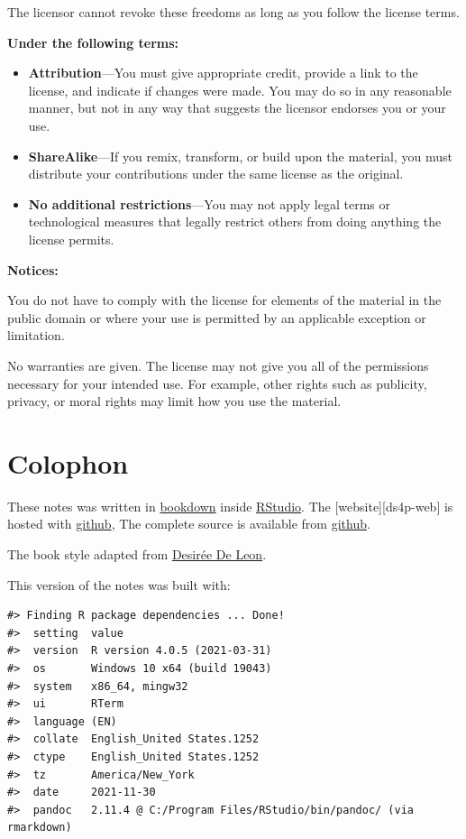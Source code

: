 \documentclass[
]{book}
\begin{document}
The licensor cannot revoke these freedoms as long as you follow the
license terms.

\textbf{Under the following terms:}

\begin{itemize}
\item
  \textbf{Attribution}---You must give appropriate credit, provide a link
  to the license, and indicate if changes were made. You may do so in
  any reasonable manner, but not in any way that suggests the licensor
  endorses you or your use.
\item
  \textbf{ShareAlike}---If you remix, transform, or build upon the material, you must distribute your contributions under the same license as the original.
\item
  \textbf{No additional restrictions}---You may not apply legal terms or
  technological measures that legally restrict others from doing
  anything the license permits.
\end{itemize}

\textbf{Notices:}

You do not have to comply with the license for elements of the
material in the public domain or where your use is permitted by an
applicable exception or limitation.

No warranties are given. The license may not give you all of the
permissions necessary for your intended use. For example, other rights
such as publicity, privacy, or moral rights may limit how you use the
material.

\hypertarget{colophon}{%
\chapter*{Colophon}\label{colophon}}

These notes was written in \href{http://bookdown.org/}{bookdown} inside \href{http://www.rstudio.com/ide/}{RStudio}. The {[}website{]}{[}ds4p-web{]} is hosted with \href{https://www.github.com}{github}, The complete source is available from \href{https://github.com/smasongarrison/syllabi}{github}.

The book style adapted from \href{https://desiree.rbind.io/}{Desirée De Leon}.

This version of the notes was built with:

\begin{verbatim}
#> Finding R package dependencies ... Done!
#>  setting  value
#>  version  R version 4.0.5 (2021-03-31)
#>  os       Windows 10 x64 (build 19043)
#>  system   x86_64, mingw32
#>  ui       RTerm
#>  language (EN)
#>  collate  English_United States.1252
#>  ctype    English_United States.1252
#>  tz       America/New_York
#>  date     2021-11-30
#>  pandoc   2.11.4 @ C:/Program Files/RStudio/bin/pandoc/ (via rmarkdown)
\end{verbatim}
\end{document}
